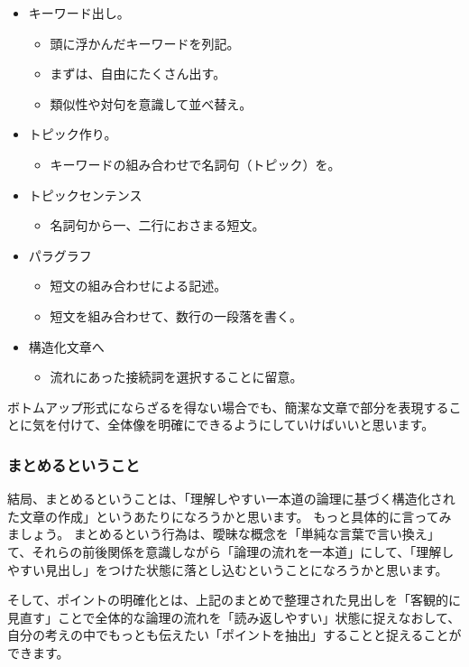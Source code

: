 \documentclass[12pt,a4paper]{jsarticle}
\begin{document}
\begin{itemize}
\item
キーワード出し。
	\begin{itemize}
	\item
	頭に浮かんだキーワードを列記。
	\item
	まずは、自由にたくさん出す。
	\item
	類似性や対句を意識して並べ替え。
	\end{itemize}
\item
トピック作り。
	\begin{itemize}
	\item
	キーワードの組み合わせで名詞句（トピック）を。
	\end{itemize}
\item
トピックセンテンス
	\begin{itemize}
	\item
	名詞句から一、二行におさまる短文。
	\end{itemize}
\item
パラグラフ
	\begin{itemize}
	\item
	短文の組み合わせによる記述。
	\item
	短文を組み合わせて、数行の一段落を書く。
	\end{itemize}
\item
構造化文章へ
	\begin{itemize}
	\item
	流れにあった接続詞を選択することに留意。
	\end{itemize}
\end{itemize}

ボトムアップ形式にならざるを得ない場合でも、簡潔な文章で部分を表現することに気を付けて、全体像を明確にできるようにしていけばいいと思います。

\subsubsection{まとめるということ}

結局、まとめるということは、「理解しやすい一本道の論理に基づく構造化された文章の作成」というあたりになろうかと思います。
もっと具体的に言ってみましょう。
まとめるという行為は、曖昧な概念を「単純な言葉で言い換え」て、それらの前後関係を意識しながら「論理の流れを一本道」にして、「理解しやすい見出し」をつけた状態に落とし込むということになろうかと思います。

そして、ポイントの明確化とは、上記のまとめで整理された見出しを「客観的に見直す」ことで全体的な論理の流れを「読み返しやすい」状態に捉えなおして、自分の考えの中でもっとも伝えたい「ポイントを抽出」することと捉えることができます。
\end{document}
